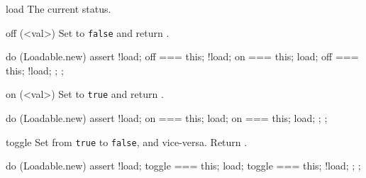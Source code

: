 \begin{urbiscriptapi}
\item[load] The current status.


\item[off](<val>)%
  Set  to \lstinline|false| and return \this.
\begin{urbiassert}
do (Loadable.new)
{
  assert
  {
    !load;
    off === this;
    !load;
    on === this;
    load;
    off === this;
    !load;
  };
};
\end{urbiassert}


\item[on](<val>)%
  Set  to \lstinline|true| and return \this.
\begin{urbiassert}
do (Loadable.new)
{
  assert
  {
    !load;
    on === this;
    load;
    on === this;
    load;
  };
};
\end{urbiassert}


\item[toggle]%
  Set  from \lstinline|true| to \lstinline|false|, and
  vice-versa.  Return .
\begin{urbiassert}
do (Loadable.new)
{
  assert
  {
    !load;
    toggle === this;
    load;
    toggle === this;
    !load;
  };
};
\end{urbiassert}
\end{urbiscriptapi}

